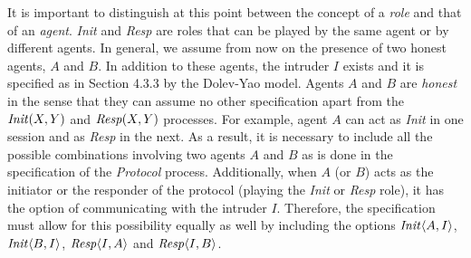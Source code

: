\documentclass[10pt,a4paper,final,oneside,fleqn]{book}
\begin{document}
It is important to distinguish at this point between the concept of a {\itshape role\/} and that of an {\itshape agent\/}.  {\itshape Init\/} and {\itshape Resp\/} are roles that can be played by the same agent or by different agents.  In general, we assume from now on the presence of two honest agents, $A$ and $B$. In addition to these agents, the intruder $I$ exists and it is specified as in Section 4.3.3 by the Dolev-Yao model. Agents $A$ and $B$ are {\itshape honest\/} in the sense that they can assume no other specification apart from the $\mbox{{\itshape Init\/}}(X,Y)$ and $\mbox{{\itshape Resp\/}}(X,Y)$ processes.  For example, agent $A$ can act as {\itshape Init\/} in one session and as {\itshape Resp\/} in the next. As a result, it is necessary to include all the possible combinations involving two agents $A$ and $B$ as is done in the specification of the {\itshape Protocol\/} process.  Additionally, when $A$ (or $B$) acts as the initiator or the responder of the protocol (playing the {\itshape Init\/} or {\itshape Resp\/} role), it has the option of communicating with the intruder $I$. Therefore, the specification must allow for this possibility equally as well by including the options $\mbox{{\itshape Init\/}}\langle A,I\rangle$, $\mbox{{\itshape Init\/}}\langle B,I\rangle$, $\mbox{{\itshape Resp\/}}\langle I,A\rangle$ and $\mbox{{\itshape Resp\/}}\langle I,B\rangle$.
\end{document}
